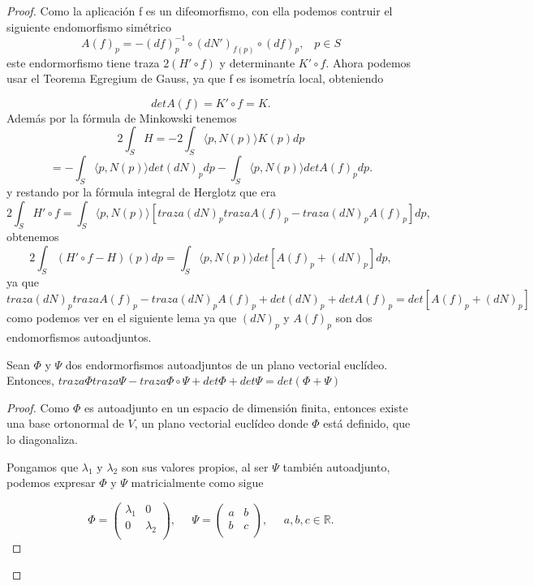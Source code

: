 \begin{proof}
	Como la aplicación f es un difeomorfismo, con ella podemos contruir el siguiente endomorfismo simétrico
	\[
		A(f)_p = -(df)^{-1}_{p} \circ (dN')_{f(p)} \circ (df)_p, \;\;\; p \in S
	\]
	este endormorfismo tiene traza $2(H' \circ f)$ y determinante $K' \circ f$. Ahora podemos usar el Teorema Egregium de Gauss, ya que f es isometría local, obteniendo
	
	\[
		det A(f) = K' \circ f = K.
	\]
	Además por la fórmula de Minkowski tenemos
	\[
		2 \int_S H = -2 \int_S \langle p, N(p) \rangle K(p) dp
	\]
	\[
		= - \int_S \langle p, N(p) \rangle det(dN)_p dp - \int_S \langle p, N(p) \rangle det A(f)_p dp.
	\]
	y restando por la fórmula integral de Herglotz que era
	\[
		2 \int_S H' \circ f = \int_S \langle p, N(p) \rangle [traza(dN)_p trazaA(f)_p - traza(dN)_p A(f)_p] dp,
	\]
	obtenemos
	\[
		2 \int_S (H' \circ f - H)(p) dp = \int_S \langle p, N(p) \rangle det[A(f)_p + (dN)_p] dp,
	\]
	ya que $traza(dN)_p trazaA(f)_p - traza(dN)_p A(f)_p + det(dN)_p + det A(f)_p = det[A(f)_p + (dN)_p]$ como podemos ver en el siguiente lema ya que $(dN)_p$ y $A(f)_p$ son dos endomorfismos autoadjuntos.
${ }$\\

	\begin{lema}
		Sean $\Phi$ y $\Psi$ dos endormorfismos autoadjuntos de un plano vectorial euclídeo. Entonces, $traza \Phi traza\Psi - traza \Phi \circ \Psi + det \Phi + det \Psi = det (\Phi + \Psi)$
	\end{lema}
	
	\begin{proof}
		Como $\Phi$ es autoadjunto en un espacio de dimensión finita, entonces existe una base ortonormal de $V$, un plano vectorial euclídeo donde $\Phi$ está definido, que lo diagonaliza.
		
		Pongamos que $\lambda_1$ y $\lambda_2$ son sus valores propios, al ser $\Psi$ también autoadjunto, podemos expresar $\Phi$ y $\Psi$ matricialmente como sigue
		
		\[
			\Phi = \left( {\begin{array}{cc}
				\lambda_1 & 0 \\
				0 & \lambda_2 \\
				\end{array} } \right),
			\;\;\;\;\;
			\Psi = \left( {\begin{array}{cc}
				a & b \\
				b & c \\
				\end{array} } \right), \;\;\;\;\; a, b,c \in \mathbb{R}.
		\]
		

\end{proof}
\end{proof}
